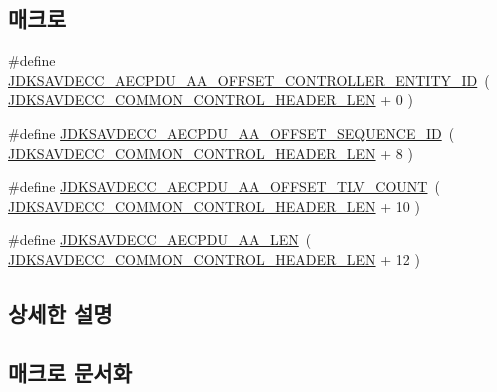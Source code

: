 \subsection*{매크로}
\begin{DoxyCompactItemize}
\item 
\#define \hyperlink{group___a_e_c_p___a_a__offsets_gaf07089779823c7d311361b667b1abd6b}{J\+D\+K\+S\+A\+V\+D\+E\+C\+C\+\_\+\+A\+E\+C\+P\+D\+U\+\_\+\+A\+A\+\_\+\+O\+F\+F\+S\+E\+T\+\_\+\+C\+O\+N\+T\+R\+O\+L\+L\+E\+R\+\_\+\+E\+N\+T\+I\+T\+Y\+\_\+\+ID}~( \hyperlink{group__jdksavdecc__avtp__common__control__header_gaae84052886fb1bb42f3bc5f85b741dff}{J\+D\+K\+S\+A\+V\+D\+E\+C\+C\+\_\+\+C\+O\+M\+M\+O\+N\+\_\+\+C\+O\+N\+T\+R\+O\+L\+\_\+\+H\+E\+A\+D\+E\+R\+\_\+\+L\+EN} + 0 )
\item 
\#define \hyperlink{group___a_e_c_p___a_a__offsets_ga938817d557268daaef605ff5121fddc0}{J\+D\+K\+S\+A\+V\+D\+E\+C\+C\+\_\+\+A\+E\+C\+P\+D\+U\+\_\+\+A\+A\+\_\+\+O\+F\+F\+S\+E\+T\+\_\+\+S\+E\+Q\+U\+E\+N\+C\+E\+\_\+\+ID}~( \hyperlink{group__jdksavdecc__avtp__common__control__header_gaae84052886fb1bb42f3bc5f85b741dff}{J\+D\+K\+S\+A\+V\+D\+E\+C\+C\+\_\+\+C\+O\+M\+M\+O\+N\+\_\+\+C\+O\+N\+T\+R\+O\+L\+\_\+\+H\+E\+A\+D\+E\+R\+\_\+\+L\+EN} + 8 )
\item 
\#define \hyperlink{group___a_e_c_p___a_a__offsets_ga3365cbf982525053196ab7f3351abad1}{J\+D\+K\+S\+A\+V\+D\+E\+C\+C\+\_\+\+A\+E\+C\+P\+D\+U\+\_\+\+A\+A\+\_\+\+O\+F\+F\+S\+E\+T\+\_\+\+T\+L\+V\+\_\+\+C\+O\+U\+NT}~( \hyperlink{group__jdksavdecc__avtp__common__control__header_gaae84052886fb1bb42f3bc5f85b741dff}{J\+D\+K\+S\+A\+V\+D\+E\+C\+C\+\_\+\+C\+O\+M\+M\+O\+N\+\_\+\+C\+O\+N\+T\+R\+O\+L\+\_\+\+H\+E\+A\+D\+E\+R\+\_\+\+L\+EN} + 10 )
\item 
\#define \hyperlink{group___a_e_c_p___a_a__offsets_ga624792b524d0f0f8ef18c2f4895003aa}{J\+D\+K\+S\+A\+V\+D\+E\+C\+C\+\_\+\+A\+E\+C\+P\+D\+U\+\_\+\+A\+A\+\_\+\+L\+EN}~( \hyperlink{group__jdksavdecc__avtp__common__control__header_gaae84052886fb1bb42f3bc5f85b741dff}{J\+D\+K\+S\+A\+V\+D\+E\+C\+C\+\_\+\+C\+O\+M\+M\+O\+N\+\_\+\+C\+O\+N\+T\+R\+O\+L\+\_\+\+H\+E\+A\+D\+E\+R\+\_\+\+L\+EN} + 12 )
\end{DoxyCompactItemize}


\subsection{상세한 설명}


\subsection{매크로 문서화}
